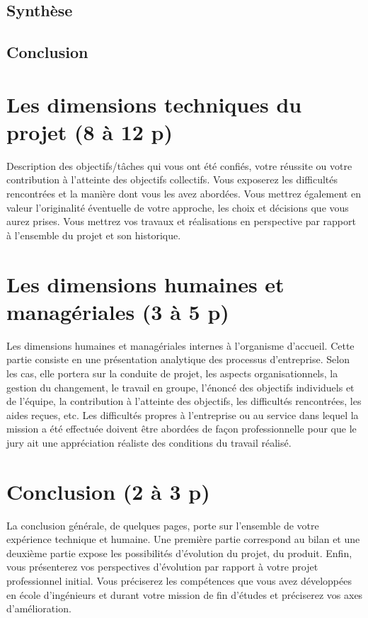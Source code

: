 \documentclass[11pt]{article}
\begin{document}
  \pagebreak


  \subsection{Synthèse}

  \pagebreak

  \subsection{Conclusion}

  \pagebreak
  \section{Les dimensions techniques du projet (8 à 12 p)}
  Description des objectifs/tâches qui vous ont été confiés, votre réussite ou votre contribution à
  l’atteinte des objectifs collectifs. Vous exposerez les difficultés rencontrées et la manière dont vous
  les avez abordées. Vous mettrez également en valeur l’originalité éventuelle de votre approche, les
  choix et décisions que vous aurez prises. Vous mettrez vos travaux et réalisations en perspective par
  rapport à l’ensemble du projet et son historique.

  \pagebreak
  \section{Les dimensions humaines et managériales (3 à 5 p)}
  Les dimensions humaines et managériales internes à l’organisme d’accueil. Cette partie consiste en
  une présentation analytique des processus d’entreprise. Selon les cas, elle portera sur la conduite de
  projet, les aspects organisationnels, la gestion du changement, le travail en groupe, l’énoncé des
  objectifs individuels et de l’équipe, la contribution à l’atteinte des objectifs, les difficultés rencontrées,
  les aides reçues, etc. Les difficultés propres à l’entreprise ou au service dans lequel la mission a été
  effectuée doivent être abordées de façon professionnelle pour que le jury ait une appréciation réaliste
  des conditions du travail réalisé.  

  \pagebreak
  \section{Conclusion (2 à 3 p)}
  La conclusion générale, de quelques pages, porte sur l’ensemble de votre expérience technique et
  humaine. Une première partie correspond au bilan et une deuxième partie expose les possibilités
  d’évolution du projet, du produit. Enfin, vous présenterez vos perspectives d’évolution par rapport à
  votre projet professionnel initial. Vous préciserez les compétences que vous avez développées en
  école d’ingénieurs et durant votre mission de fin d’études et préciserez vos axes d’amélioration.
\end{document}
